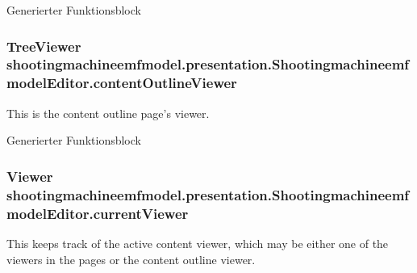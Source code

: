 Generierter Funktionsblock \hypertarget{classshootingmachineemfmodel_1_1presentation_1_1_shootingmachineemfmodel_editor_a439e5c9044414c12d0872c9375a557e7}{
\subsubsection[{content\-Outline\-Viewer}]{\setlength{\rightskip}{0pt plus 5cm}Tree\-Viewer shootingmachineemfmodel.\-presentation.\-Shootingmachineemfmodel\-Editor.\-content\-Outline\-Viewer\hspace{0.3cm}{\ttfamily [protected]}}}\label{classshootingmachineemfmodel_1_1presentation_1_1_shootingmachineemfmodel_editor_a439e5c9044414c12d0872c9375a557e7}
This is the content outline page's viewer.

Generierter Funktionsblock \hypertarget{classshootingmachineemfmodel_1_1presentation_1_1_shootingmachineemfmodel_editor_a38114af71dfd97a0defcebc62aef236f}{
\subsubsection[{current\-Viewer}]{\setlength{\rightskip}{0pt plus 5cm}Viewer shootingmachineemfmodel.\-presentation.\-Shootingmachineemfmodel\-Editor.\-current\-Viewer\hspace{0.3cm}{\ttfamily [protected]}}}\label{classshootingmachineemfmodel_1_1presentation_1_1_shootingmachineemfmodel_editor_a38114af71dfd97a0defcebc62aef236f}
This keeps track of the active content viewer, which may be either one of the viewers in the pages or the content outline viewer.

